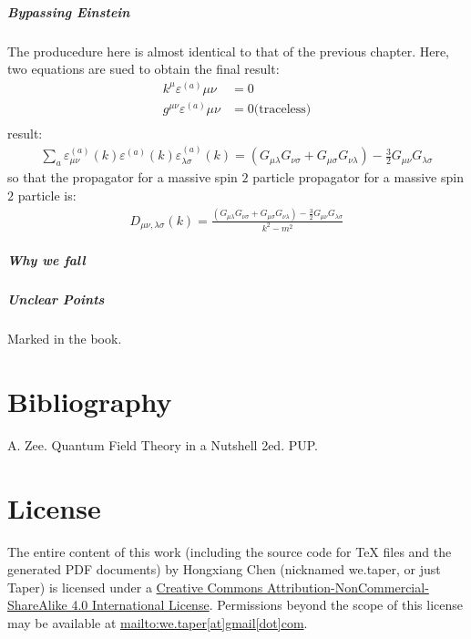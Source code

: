 \documentclass{book}
\numberwithin{equation}{subsection} %
\theoremstyle{definition}
\begin{document}
\paragraph{Bypassing Einstein}

The producedure here is almost identical to that of the previous chapter.
Here, two equations are sued to obtain the final result:
\begin{align}
    k^\mu \varepsilon^{(a)}{\mu\nu} &= 0\\
    g^{\mu\nu}\varepsilon^{(a)}{\mu\nu}&=0 \text{(traceless)}\\
\end{align}
result:
\begin{align}
    \sum_a \varepsilon^{(a)}_{\mu\nu}(k) \varepsilon^{(a)}(k)
        \varepsilon^{(a)}_{\lambda\sigma}(k)=
        (G_{\mu\lambda}G_{\nu\sigma}+G_{\mu\sigma}G_{\nu\lambda})
        -\frac{3}{2}G_{\mu\nu} G_{\lambda\sigma}
\end{align}
so that the propagator for a massive spin $2$ particle 
{propagator for a massive spin $2$ particle\nomrefpage}
is:
\begin{align}
    D_{\mu\nu,\lambda\sigma}(k)=
    \frac{ (G_{\mu\lambda}G_{\nu\sigma}+G_{\mu\sigma}G_{\nu\lambda})
        -\frac{3}{2}G_{\mu\nu} G_{\lambda\sigma} }
        {k^2-m^2}
\end{align}

\paragraph{ Why we fall}

\paragraph{Unclear Points} Marked in the book.

\chapter{Bibliography}
\begin{thebibliography}{1}
	 A. Zee. Quantum Field Theory in a Nutshell
		2ed. PUP.
\end{thebibliography}
\chapter{License}
The entire content of this work (including the source code
for TeX files and the generated PDF documents) by 
Hongxiang Chen (nicknamed we.taper, or just Taper) is
licensed under a 
\href{http://creativecommons.org/licenses/by-nc-sa/4.0/}{Creative 
	Commons Attribution-NonCommercial-ShareAlike 4.0 International 
	License}. Permissions beyond the scope of this 
license may be available at \url{mailto:we.taper[at]gmail[dot]com}.

\printnomenclature
\end{document}
